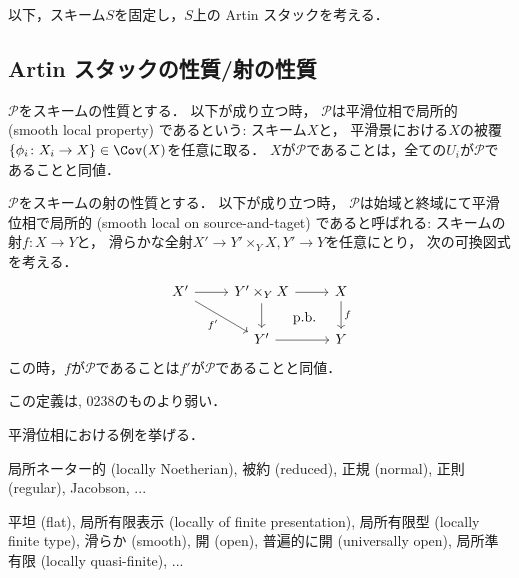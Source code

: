     以下，スキーム$S$を固定し，$S$上の Artin スタックを考える．

\subsection{Artin スタックの性質/射の性質}\label{sec:artin_st_mor}
    \begin{Def}
    \begin{myenum}
    \item
        $\mathcal{P}$をスキームの性質とする．
        以下が成り立つ時，
        $\mathcal{P}$は平滑位相で局所的 (smooth local property) であるという: \newline
        スキーム$X$と，
        平滑景における$X$の被覆
        $\{\phi_i \colon X_i \to X\} \in \Cov(X)$を任意に取る．
        $X$が$\mathcal{P}$であることは，全ての$U_i$が$\mathcal{P}$であることと同値．
    \item
        $\mathcal{P}$をスキームの射の性質とする．
        以下が成り立つ時，
        $\mathcal{P}$は始域と終域にて平滑位相で局所的 (smooth local on source-and-taget) であると呼ばれる: \newline
        スキームの射$f \colon X \to Y$と，
        滑らかな全射$X' \to Y' \times_{Y} X, Y' \to Y$を任意にとり，
        次の可換図式を考える．
        \[
        \begin{tikzcd}
            X' \ar[r] \ar[rd, "f'"']& Y' \times_{Y} X \ar[r]\ar[d]& X \ar[d, "f"]\\
            {} & Y' \ar[r]& Y \ar[lu, phantom, "\text{p.b.}"]
        \end{tikzcd}
        \]
        この時，$f$が$\mathcal{P}$であることは$f'$が$\mathcal{P}$であることと同値．
    \end{myenum}
    \end{Def}
    この定義は\cite{Olsson16}, \cite{SP} 0238のものより弱い．

    \begin{Example}[\cite{SP} 0238, 04YH]
    平滑位相における例を挙げる．
    \begin{description}[labelindent=0.5cm]
    \item[平滑位相で局所的な性質の例] \mnewline
        局所ネーター的 (locally Noetherian), 被約 (reduced), 正規 (normal), 正則 (regular), Jacobson, ...

    \item[始域と終域にて平滑位相で局所的な性質の例] \mnewline
        平坦 (flat), 局所有限表示 (locally of finite presentation), 局所有限型 (locally finite type),
        滑らか (smooth), 開 (open), 普遍的に開 (universally open), 局所準有限 (locally quasi-finite), ...
    \end{description}
    \end{Example}


